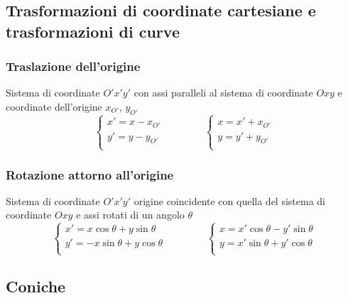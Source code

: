\subsection{Trasformazioni di coordinate cartesiane e trasformazioni di curve}
\subsubsection{Traslazione dell'origine}
Sistema di coordinate $O'x'y'$ con assi paralleli al sistema di coordinate $Oxy$ e coordinate dell'origine $x_{O'}$, $y_{O'}$
\begin{equation}
    \begin{cases}
        x' = x - x_{O'} \\
        y' = y - y_{O'} \\
    \end{cases}
    \qquad \qquad
    \begin{cases}
        x  = x'+ x_{O'} \\
        y  = y'+ y_{O'} \\
    \end{cases}
\end{equation}
\subsubsection{Rotazione attorno all'origine}
Sistema di coordinate $O'x'y'$ origine coincidente con quella del sistema di coordinate $Oxy$ e assi rotati di un angolo $\theta$
\begin{equation}
    \begin{cases}
        x' =  x \cos \theta + y \sin \theta \\
        y' = -x \sin \theta + y \cos \theta \\
    \end{cases}
    \qquad \qquad
    \begin{cases}
        x  =  x'\cos \theta - y'\sin \theta \\
        y  =  x'\sin \theta + y'\cos \theta \\
    \end{cases}
\end{equation}

\subsection{Coniche}
